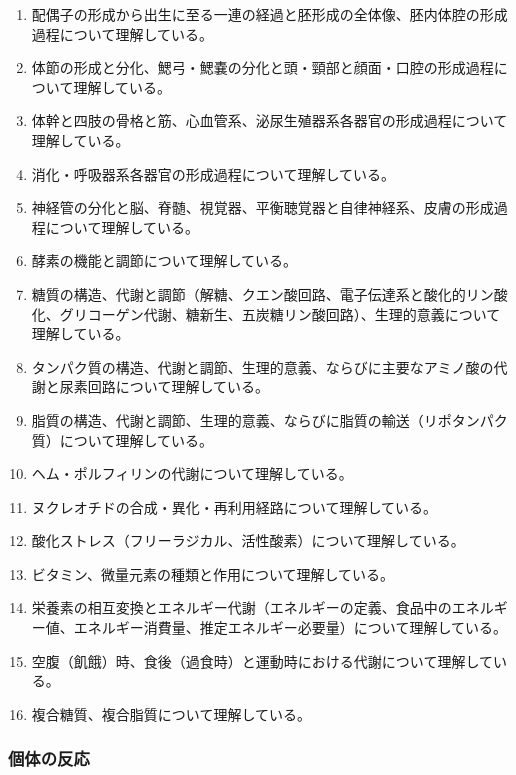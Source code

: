 \begin{enumerate}
\item
  配偶子の形成から出生に至る一連の経過と胚形成の全体像、胚内体腔の形成過程について理解している。
\item
  体節の形成と分化、鰓弓・鰓嚢の分化と頭・頸部と顔面・口腔の形成過程について理解している。
\item
  体幹と四肢の骨格と筋、心血管系、泌尿生殖器系各器官の形成過程について理解している。
\item
  消化・呼吸器系各器官の形成過程について理解している。
\item
  神経管の分化と脳、脊髄、視覚器、平衡聴覚器と自律神経系、皮膚の形成過程について理解している。
\item
  酵素の機能と調節について理解している。
\item
  糖質の構造、代謝と調節（解糖、クエン酸回路、電子伝達系と酸化的リン酸化、グリコーゲン代謝、糖新生、五炭糖リン酸回路）、生理的意義について理解している。
\item
  タンパク質の構造、代謝と調節、生理的意義、ならびに主要なアミノ酸の代謝と尿素回路について理解している。
\item
  脂質の構造、代謝と調節、生理的意義、ならびに脂質の輸送（リポタンパク質）について理解している。
\item
  ヘム・ポルフィリンの代謝について理解している。
\item
  ヌクレオチドの合成・異化・再利用経路について理解している。
\item
  酸化ストレス（フリーラジカル、活性酸素）について理解している。
\item
  ビタミン、微量元素の種類と作用について理解している。
\item
  栄養素の相互変換とエネルギー代謝（エネルギーの定義、食品中のエネルギー値、エネルギー消費量、推定エネルギー必要量）について理解している。
\item
  空腹（飢餓）時、食後（過食時）と運動時における代謝について理解している。
\item
  複合糖質、複合脂質について理解している。
\end{enumerate}

\hypertarget{ux500bux4f53ux306eux53cdux5fdc}{%
\subsubsection{個体の反応}\label{ux500bux4f53ux306eux53cdux5fdc}}

